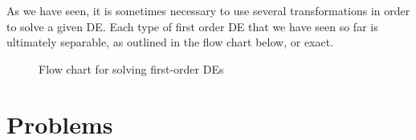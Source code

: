 \documentclass[10pt,driverfallback=hypertex]{report}
\newcounter{small}
\begin{document}
As we have seen, it is sometimes necessary to use several
transformations in order to solve a given DE.  Each type of first
order DE that we have seen so far is ultimately separable, as outlined
in the flow chart below, or exact.

\vspace{0.5in}
\begin{figure}[htbp]
  \centering
  \caption{Flow chart for solving first-order DEs}
  \label{fig:first_order_flow_shar}
\end{figure}


\section{Problems}
\end{document}
